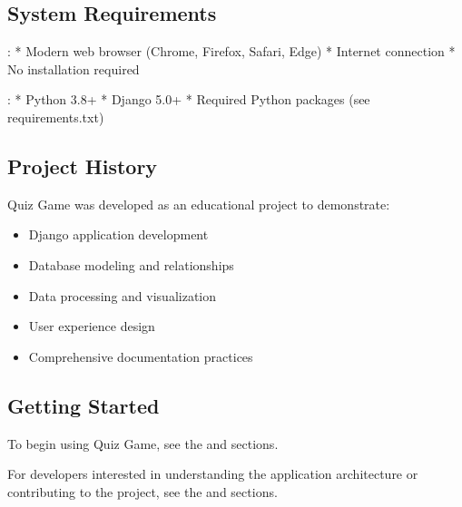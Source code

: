 \documentclass[letterpaper,10pt,english]{sphinxmanual}
\begin{document}
\subsection{System Requirements}
\label{\detokenize{introduction:system-requirements}}
\sphinxAtStartPar
{}:
* Modern web browser (Chrome, Firefox, Safari, Edge)
* Internet connection
* No installation required

\sphinxAtStartPar
{}:
* Python 3.8+
* Django 5.0+
* Required Python packages (see requirements.txt)


\subsection{Project History}
\label{\detokenize{introduction:project-history}}
\sphinxAtStartPar
Quiz Game was developed as an educational project to demonstrate:
\begin{itemize}
\item {} 
\sphinxAtStartPar
Django application development

\item {} 
\sphinxAtStartPar
Database modeling and relationships

\item {} 
\sphinxAtStartPar
Data processing and visualization

\item {} 
\sphinxAtStartPar
User experience design

\item {} 
\sphinxAtStartPar
Comprehensive documentation practices

\end{itemize}


\subsection{Getting Started}
\label{\detokenize{introduction:getting-started}}
\sphinxAtStartPar
To begin using Quiz Game, see the {\hyperref[\detokenize{installation::doc}]{}} and {\hyperref[\detokenize{user_guide::doc}]{}} sections.

\sphinxAtStartPar
For developers interested in understanding the application architecture or contributing
to the project, see the {\hyperref[\detokenize{architecture::doc}]{}} and  sections.
\end{document}
